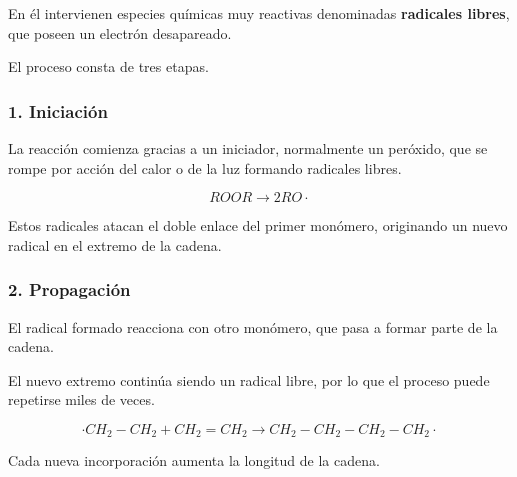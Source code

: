 En él intervienen especies químicas muy reactivas denominadas
\textbf{radicales libres}, que poseen un electrón desapareado.

El proceso consta de tres etapas.


\subsubsection*{1. Iniciación}

La reacción comienza gracias a un iniciador, normalmente un peróxido, que se rompe
por acción del calor o de la luz formando radicales libres.

\[
ROOR
\longrightarrow
2RO\cdot
\]

Estos radicales atacan el doble enlace del primer monómero, originando un nuevo
radical en el extremo de la cadena.

\vspace{0.4cm}

\begin{center}




\end{center}


\subsubsection*{2. Propagación}

El radical formado reacciona con otro monómero, que pasa a formar parte de la cadena.

El nuevo extremo continúa siendo un radical libre, por lo que el proceso puede
repetirse miles de veces.

\[
\cdot CH_2-CH_2
+
CH_2=CH_2
\longrightarrow
CH_2-CH_2-CH_2-CH_2\cdot
\]

Cada nueva incorporación aumenta la longitud de la cadena.

